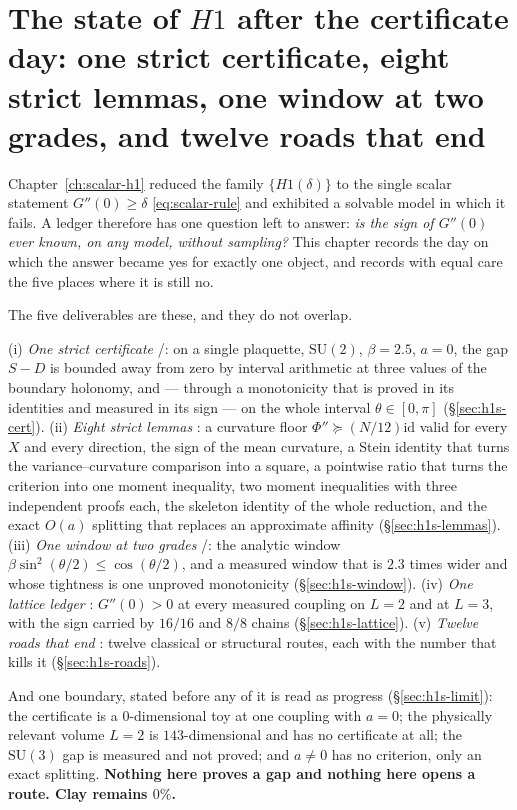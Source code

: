 \section{The state of $H1$ after the certificate day: one strict certificate, eight strict
lemmas, one window at two grades, and twelve roads that end}
\label{ch:h1-status}

Chapter~\ref{ch:scalar-h1} reduced the family $\{H1(\delta)\}$ to the single scalar statement
$G''(0)\ge\delta$ \eqref{eq:scalar-rule} and exhibited a solvable model in which it fails. A ledger
therefore has one question left to answer: \emph{is the sign of $G''(0)$ ever \emph{known}, on any
model, without sampling?} This chapter records the day on which the answer became yes for exactly one
object, and records with equal care the five places where it is still no.

The five deliverables are these, and they do not overlap.

(i) \emph{One strict certificate} \LT{}/\LC: on a single plaquette, $\mathrm{SU}(2)$, $\beta=2.5$,
$a=0$, the gap $S-D$ is bounded away from zero by interval arithmetic at three values of the boundary
holonomy, and --- through a monotonicity that is proved in its identities and measured in its sign ---
on the whole interval $\theta\in[0,\pi]$ (\S\ref{sec:h1s-cert}). (ii) \emph{Eight strict lemmas}
\LT{}: a curvature floor $\Phi''\succeq(N/12)\mathrm{id}$ valid for every $X$ and every direction, the
sign of the mean curvature, a Stein identity that turns the variance--curvature comparison into a
square, a pointwise ratio that turns the criterion into one moment inequality, two moment inequalities
with three independent proofs each, the skeleton identity of the whole reduction, and the exact
$O(a)$ splitting that replaces an approximate affinity (\S\ref{sec:h1s-lemmas}). (iii) \emph{One
window at two grades} \LT{}/\LC: the analytic window $\beta\sin^{2}(\theta/2)\le\cos(\theta/2)$, and a
measured window that is $2.3$ times wider and whose tightness is one unproved monotonicity
(\S\ref{sec:h1s-window}). (iv) \emph{One lattice ledger} \LE: $G''(0)>0$ at every measured coupling
on $L=2$ and at $L=3$, with the sign carried by $16/16$ and $8/8$ chains (\S\ref{sec:h1s-lattice}).
(v) \emph{Twelve roads that end} \LN: twelve classical or structural routes, each with the number that
kills it (\S\ref{sec:h1s-roads}).

And one boundary, stated before any of it is read as progress (\S\ref{sec:h1s-limit}): the certificate
is a $0$-dimensional toy at one coupling with $a=0$; the physically relevant volume $L=2$ is
$143$-dimensional and has no certificate at all; the $\mathrm{SU}(3)$ gap is measured and not proved;
and $a\neq0$ has no criterion, only an exact splitting. \textbf{Nothing here proves a gap and nothing
here opens a route. Clay remains $0\%$.}

